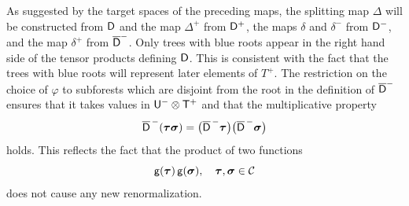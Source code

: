 \documentclass[10pt, reqno]{amsart}
\numberwithin{subsection}{section}
\numberwithin{subsubsection}{subsection}
\numberwithin{equation}{section} %
\theoremstyle{mystyle}
\theoremstyle{mystyle2}
\theoremstyle{mystyle3}
\newcommand{\bstau}{\boldsymbol{\tau}}
\newcommand{\bssigma}{\boldsymbol{\sigma}}
\begin{document}
\medskip

As suggested by the target spaces of the preceding maps, the splitting map $\Delta$ will be constructed from $\sf D$ and the map $\Delta^+$ from ${\sf D}^+$, the maps $\delta$ and $\delta^-$ from ${\sf D}^-$, and the map $\delta^+$ from $\overline{\sf D}^-$. Only trees with blue roots appear 
in the right hand side of the tensor products defining $\sf D$. This is consistent with the fact that the trees with blue roots will represent later elements of $T^+$. The restriction on the choice of $\varphi$ to subforests which are disjoint from the root in the definition of $\overline{\sf D}^-$ ensures that it takes values in ${\sf U}^-\otimes{\sf T}^+$ and that the multiplicative property
$$
\overline{\sf D}^{\,-}(\bstau\bssigma) = \big(\overline{\sf D}^{\,-}\bstau\big)\big(\overline{\sf D}^{\,-}\bssigma\big)
$$ 
holds. This reflects the fact that the product of two functions
$$
{\sf g}(\bstau)\,{\sf g}(\bssigma),\quad \bstau,\bssigma\in \mathcal{C}
$$
does not cause any new renormalization.

\medskip
\end{document}
